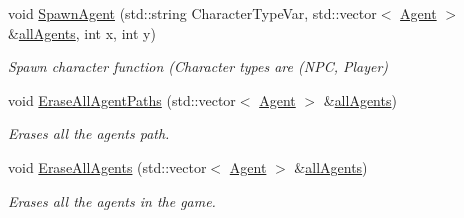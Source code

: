 \begin{DoxyCompactItemize}
void \hyperlink{class_agent_manager_a67b4e05ac1f86c7cb3cf5d5ea0573b91}{Spawn\+Agent} (std\+::string Character\+Type\+Var, std\+::vector$<$ \hyperlink{class_agent}{Agent} $>$ \&\hyperlink{class_agent_manager_a599aa8ac7b9ac078c77b493278d2b6da}{all\+Agents}, int x, int y)
\begin{DoxyCompactList}\small\item\em Spawn character function (Character types are (N\+PC, Player) \end{DoxyCompactList}\item 
\mbox{\label{class_agent_manager_ab99bb1f844d39a407c73ab8ec57c8a8a}} 
void \hyperlink{class_agent_manager_ab99bb1f844d39a407c73ab8ec57c8a8a}{Erase\+All\+Agent\+Paths} (std\+::vector$<$ \hyperlink{class_agent}{Agent} $>$ \&\hyperlink{class_agent_manager_a599aa8ac7b9ac078c77b493278d2b6da}{all\+Agents})
\begin{DoxyCompactList}\small\item\em Erases all the agents path. \end{DoxyCompactList}\item 
\mbox{\label{class_agent_manager_aeb752dda5f920cadcf18f5e5ee90b2d6}} 
void \hyperlink{class_agent_manager_aeb752dda5f920cadcf18f5e5ee90b2d6}{Erase\+All\+Agents} (std\+::vector$<$ \hyperlink{class_agent}{Agent} $>$ \&\hyperlink{class_agent_manager_a599aa8ac7b9ac078c77b493278d2b6da}{all\+Agents})
\begin{DoxyCompactList}\small\item\em Erases all the agents in the game. \end{DoxyCompactList}\end{DoxyCompactItemize}
